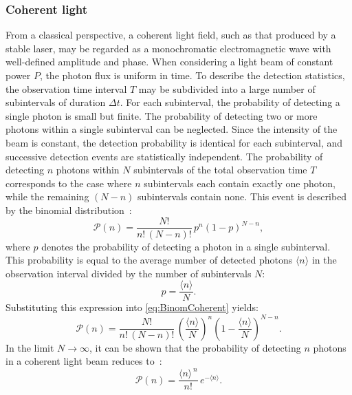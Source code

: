 \subsubsection{Coherent light}\label{sec:cohLight}
From a classical perspective, a coherent light field, such as that produced by a stable laser, may be regarded as a monochromatic electromagnetic wave with well-defined amplitude and phase. \newline
When considering a light beam of constant power $P$, the photon flux is uniform in time. To describe the detection statistics, the observation time interval $T$ may be subdivided into a large number of subintervals of duration $\Delta t$. For each subinterval, the probability of detecting a single photon is small but finite. The probability of detecting two or more photons within a single subinterval can be neglected. \newline
Since the intensity of the beam is constant, the detection probability is identical for each subinterval, and successive detection events are statistically independent.  \newline
The probability of detecting $n$ photons within $N$ subintervals of the total observation time $T$ corresponds to the case where $n$ subintervals each contain exactly one photon, while the remaining $(N-n)$ subintervals contain none. This event is described by the binomial distribution~\cite{foxQuantumOpticsIntroduction2006}:
\begin{equation}
	\mathcal{P}(n) = \frac{N!}{n!\,(N-n)!}\,p^{n}(1-p)^{N-n},
	\label{eq:BinomCoherent}
\end{equation}
where $p$ denotes the probability of detecting a photon in a single subinterval. This probability is equal to the average number of detected photons $\langle n\rangle$ in the observation interval divided by the number of subintervals $N$:
\begin{equation}
	p = \frac{\langle n\rangle}{N}.
\end{equation}
Substituting this expression into \autoref{eq:BinomCoherent} yields:
\begin{equation}
	\mathcal{P}(n) = \frac{N!}{n!\,(N-n)!}\,
	\left(\frac{\langle n\rangle}{N}\right)^{n}
	\left(1-\frac{\langle n\rangle}{N}\right)^{N-n}.
\end{equation}
In the limit $N \to \infty$, it can be shown that the probability of detecting $n$ photons in a coherent light beam reduces to~\cite{foxQuantumOpticsIntroduction2006}:
\begin{equation}
	\mathcal{P}(n) = \frac{\langle n\rangle^{\,n}}{n!}\,e^{-\langle n\rangle}.
\end{equation}
